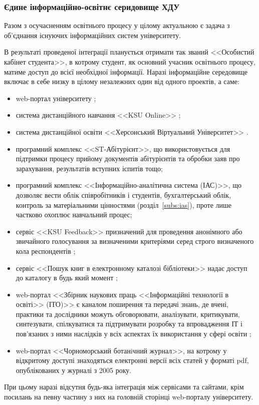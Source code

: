 \subsubsection{Єдине інформаційно-освітнє серидовище ХДУ}

Разом з осучасненням освітнього процесу у цілому актуальною є задача з об'єднання існуючих інформаційних систем університету.

В результаті проведеної інтеграції планується отримати так званий <<Особистий кабінет студента>>, в котрому студент, як основний учасник освітнього процесу, матиме доступ до всієї необхідної інформації. Наразі інформаційне середовище включає в себе низку в цілому незалежних один від одного проектів, а саме:

\begin{itemize}
	\item web-портал університету \cite{KspuEdu};
	\item система дистанційного навчання <<KSU Online>> \cite{KsuOnline};
	\item система дистанційної освіти <<Херсонський Віртуальний Університет>> \cite{KsuDis}.
	\item програмний комплекс <<ST-Абітурієнт>>, що використовується для підтримки процесу прийому документів абітурієнтів та обробки заяв про зарахування, результатів вступних іспитів тощо;
	\item програмний комплекс <<Інформаційно-аналітична система (ІАС)>>, що дозволяє вести облік співробітників і студентів, бухгалтерський облік, контроль за матеріальними цінностями (розділ~\ref{subs:ias}), проте лише частково охоплює навчальний процес;
	\item сервіс <<KSU Feedback>> призначений для проведення анонімного або звичайного голосування за визначеними критеріями серед строго визначеного кола респондентів \cite{KsuFeedback};
	\item сервіс  <<Пошук книг в електронному каталозі бібліотеки>> надає доступ до каталогу в будь який момент \cite{eLibrary};
	\item web-портал <<Збірник наукових праць <<Інформаційні технології в освіті>> (ІТО)>> є каналом поширення та передачі знань, де вчені, практики та дослідники можуть обговорювати, аналізувати, критикувати, синтезувати, спілкуватися та підтримувати розробку та впровадження ІТ і пов'язаних з ними наслідків у всіх аспектах їх використання у сфері освіти \cite{ITO};
	\item web-портал <<Чорноморський ботанiчний журнал>>, на котрому у відкритому доступі знаходяться електронні версії всіх статей у форматі pdf, опублікованих у журналі з 2005 року.
\end{itemize}

При цьому наразі відсутня будь-яка інтеграція між сервісами та сайтами, крім посилань на певну частину з них на головній сторінці web-порталу університету.
